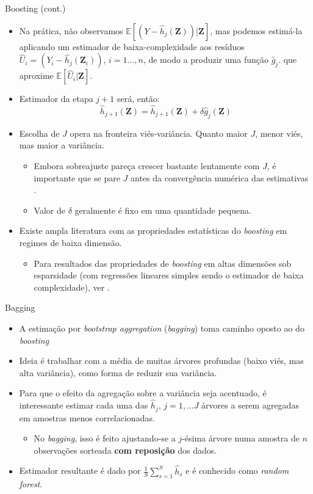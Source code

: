 \documentclass[11pt]{beamer}
\begin{document}
\begin{frame}{Boosting (cont.)}
\begin{itemize}
	 \item Na prática, não observamos $ \mathbb{E}[(Y-\hat{h}_j(\boldsymbol{Z}))|\boldsymbol{Z}]$, mas podemos estimá-la aplicando um estimador de baixa-complexidade aos resíduos $\hat{U}_i = (Y_i-\hat{h}_j(\boldsymbol{Z}_i))$, $i=1\ldots, n$, de modo a produzir uma função $\hat{g}_j$. que aproxime $\mathbb{E}[\hat{U}_i|\boldsymbol{Z}]$.
	 \item Estimador da etapa $j+1$ será, então:
	$$\hat{h}_{j+1}(\boldsymbol{Z}) = \hat{h}_{j+1}(\boldsymbol{Z}) +\delta \hat{g}_j(\boldsymbol{Z})$$
	\item Escolha de $J$ opera na fronteira viés-variância. Quanto maior $J$, menor viés, mas maior a variância.
	\begin{itemize}
		\item Embora sobreajuste pareça crescer bastante lentamente com $J$, é importante que se pare $J$ antes da convergência numérica das estimativas \citep{buhlmann2003,buhlmann2007}.
		\item Valor de $\delta$ geralmente é fixo em uma quantidade pequena.
	\end{itemize}

		\item Existe ampla literatura com as propriedades estatísticas do \textit{boosting} em regimes de baixa dimensão.
		\begin{itemize}
	\item Para resultados das propriedades de \textit{boosting} em altas dimensões sob esparsidade (com regressões lineares simples sendo o estimador de baixa complexidade), ver \citet{Kueck2023}.
	\end{itemize}
\end{itemize}
\end{frame}

\begin{frame}{Bagging}
\begin{itemize}
	\item A estimação por \textit{bootstrap aggregation}  (\textit{bagging}) toma caminho oposto ao do \textit{boosting}
	\item Ideia é trabalhar com a média de muitas árvores profundas (baixo viés, mas alta variância), como forma de reduzir sua variância.
	\item Para que o efeito da agregação sobre a variância seja acentuado, é interessante estimar cada uma das $\hat{h}_j$, $j=1,\ldots J$ árvores a serem agregadas em amostras menos correlacionadas.
	\begin{itemize}
		\item No \textit{bagging}, isso é feito ajustando-se a $j$-ésima árvore numa amostra de $n$ observações sorteada \textbf{com reposição} dos dados.
	\end{itemize}
			\item Estimador resultante é dado por $\frac{1}{S}\sum_{s=1}^S\hat{h}_s$ e é conhecido como \textit{random forest}.
			
\end{itemize}
\end{frame}
\end{document}
